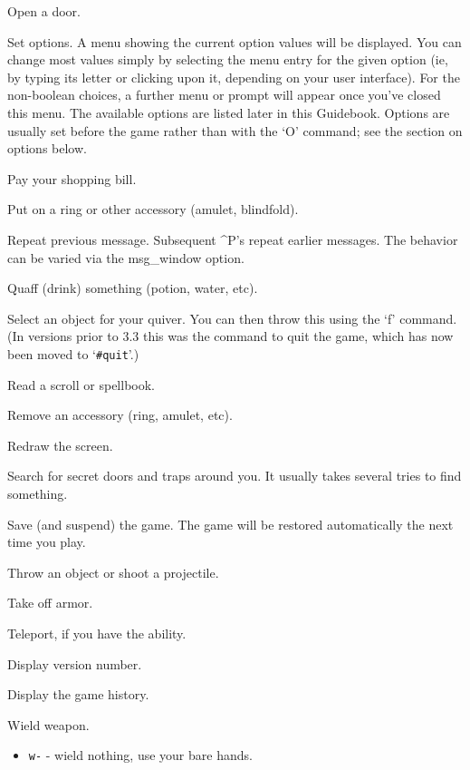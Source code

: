 \item[\tb{o}]
Open a door.
\item[\tb{O}]
Set options.  A menu showing the current option values will be
displayed.  You can change most values simply by selecting the menu
entry for the given option (ie, by typing its letter or clicking upon
it, depending on your user interface).  For the non-boolean choices,
a further menu or prompt will appear once you've closed this menu.
The available options
are listed later in this Guidebook.  Options are usually set before the
game rather than with the `O' command; see the section on options below.
\item[\tb{p}]
Pay your shopping bill.
\item[\tb{P}]
Put on a ring or other accessory (amulet, blindfold).
\item[\tb{\^P}]
Repeat previous message.  Subsequent \^{}P's repeat earlier messages.
The behavior can be varied via the msg\_window option.
\item[\tb{q}]
Quaff (drink) something (potion, water, etc).
\item[\tb{Q}]
Select an object for your quiver.  You can then throw this using
the `f' command.  (In versions prior to 3.3 this was the command to quit
the game, which has now been moved to `{\tt \#quit}'.)
\item[\tb{r}]
Read a scroll or spellbook.
\item[\tb{R}]
Remove an accessory (ring, amulet, etc).
\item[\tb{\^R}]
Redraw the screen.
\item[\tb{s}]
Search for secret doors and traps around you.  It usually takes several
tries to find something.
\item[\tb{S}]
Save (and suspend) the game.  The game will be restored automatically the
next time you play.
\item[\tb{t}]
Throw an object or shoot a projectile.
\item[\tb{T}]
Take off armor.
\item[\tb{\^T}]
Teleport, if you have the ability.
\item[\tb{v}]
Display version number.
\item[\tb{V}]
Display the game history.
\item[\tb{w}]
Wield weapon.
\begin{itemize}
\item {\tt w-} - wield nothing, use your bare hands.
\end{itemize}
\item[\tb{W}]
